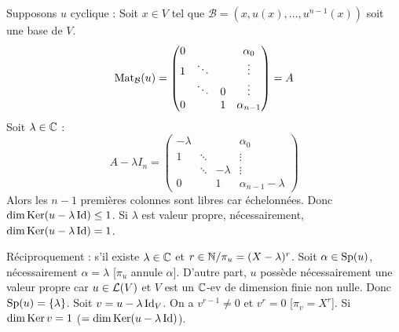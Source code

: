 \begin{solution}
Supposons $u$ cyclique : Soit $x \in V$ tel que $\mathcal B = (x, u(x), \dots, u^{n-1}(x))$ soit une base de $V$.
\[
\operatorname{Mat}_{\mathcal B}(u) =
\begin{pmatrix}
0 & & & \alpha_0 \\
1 & \ddots & & \vdots \\
& \ddots & 0 & \vdots \\
0 & & 1 & \alpha_{n-1}
\end{pmatrix} = A
\]
Soit $\lambda \in \mathbb C$ :
\[
A - \lambda I_n =
\begin{pmatrix}
-\lambda & & & \alpha_0 \\
1 & \ddots & & \vdots \\
& \ddots & -\lambda & \vdots \\
0 & & 1 & \alpha_{n-1} - \lambda
\end{pmatrix}
\]
Alors les $n-1$ premières colonnes sont libres car échelonnées.
Donc $\dim \operatorname{Ker}(u - \lambda \operatorname{Id}) \leq 1$. Si $\lambda$ est valeur propre, nécessairement, $\dim \operatorname{Ker}(u - \lambda \operatorname{Id}) = 1$.

Réciproquement : s'il existe $\lambda \in \mathbb C$ et $r \in \mathbb N / \pi_u = (X-\lambda)^r$.
Soit $\alpha \in \operatorname{Sp}(u)$, nécessairement $\alpha = \lambda$ [$\pi_u$ annule $\alpha$].
D'autre part, $u$ possède nécessairement une valeur propre car $u \in \mathcal L(V)$ et $V$ est un $\mathbb C$-ev de dimension finie non nulle. Donc $\operatorname{Sp}(u) = \{\lambda\}$.
Soit $v = u - \lambda \operatorname{Id}_V$.
On a $v^{r-1} \neq 0$ et $v^r = 0$ [$\pi_v = X^r$].
Si $\dim \operatorname{Ker} v = 1$ ($=\dim \operatorname{Ker}(u - \lambda \operatorname{Id})$).


\end{solution}
